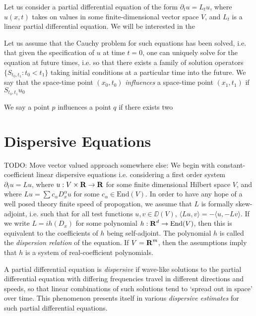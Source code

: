 Let us consider a partial differential equation of the form $\partial_t u = L_t u$, where $u(x,t)$ takes on values in some finite-dimensional vector space $V$, and $L_t$ is a linear partial differential equation. We will be interested in the 


Let us assume that the Cauchy problem for such equations has been solved, i.e. that given the specification of $u$ at time $t = 0$, one can uniquely solve for the equation at future times, i.e. so that there exists a family of solution operators $\{ S_{t_0,t_1} : t_0 < t_1 \}$ taking initial conditions at a particular time into the future. We say that the space-time point $(x_0,t_0)$ \emph{influences} a space-time point $(x_1,t_1)$ if $S_{t_0,t_1} u_0$

We say a point $p$ influences a point $q$ if there exists two 









\chapter{Dispersive Equations}

TODO: Move vector valued approach somewhere else: We begin with constant-coefficient linear dispersive equations i.e. considering a first order system $\partial_t u = Lu$, where $u: V \times \operatorname{\mathbf{R}} \to \operatorname{\mathbf{R}}$ for some finite dimensional Hilbert space $V$, and where $Lu = \sum c_\alpha D_x^\alpha u$ for some $c_\alpha \in \text{End}(V)$. In order to have any hope of a well posed theory  finite speed of propogation, we assume that $L$ is formally skew-adjoint, i.e. such that for all test functions $u,v \in \DD(V)$, $\langle Lu, v \rangle = - \langle u, -Lv \rangle$. If we write $L = i h(D_x)$ for some polynomial $h: \operatorname{\mathbf{R}}^d \to \text{End}(V)$, then this is equivalent to the coefficients of $h$ being self-adjoint. The polynomial $h$ is called the \emph{dispersion relation} of the equation. If $V = \operatorname{\mathbf{R}}^m$, then the assumptions imply that $h$ is a system of real-coefficient polynomials.

\newpage

A partial differential equation is \emph{dispersive} if wave-like solutions to the partial differential equation with differing frequencies travel in different directions and speeds, so that linear combinations of such solutions tend to `spread out in space' over time. This phenomenon presents itself in various \emph{dispersive estimates} for such partial differential equations.


